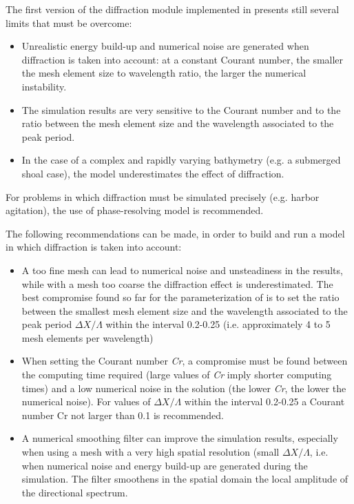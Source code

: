  The first version of the diffraction module implemented in \tomawac presents still several limits that must be overcome:

\begin{itemize}
\item  Unrealistic energy build-up and numerical noise are generated when diffraction is taken into account: at a constant Courant
  number, the smaller the mesh element size to wavelength ratio, the larger the numerical instability.

\item  The simulation results are very sensitive to the Courant number and to the ratio between the mesh element size and the
  wavelength associated to the peak period.

\item  In the case of a complex and rapidly varying bathymetry (e.g. a submerged shoal case), the model underestimates the effect of
  diffraction.
\end{itemize}

 For problems in which diffraction must be simulated precisely (e.g. harbor agitation), the use of phase-resolving model is recommended.

 The following recommendations can be made, in order to build and run a \tomawac model in which diffraction is taken into account:

\begin{itemize}
\item  A too fine mesh can lead to numerical noise and unsteadiness in the results, while with a mesh too coarse the diffraction
  effect is underestimated. The best compromise found so far for the parameterization of \tomawac is to set the ratio between the
  smallest mesh element size and the wavelength associated to the peak period $\Delta X/\Lambda$ within the interval 0.2-0.25 (i.e.
  approximately 4 to 5 mesh elements per wavelength)

\item  When setting the Courant number \textit{Cr}, a compromise must be found between the computing time required (large values of
  \textit{Cr} imply shorter computing times) and a low numerical noise in the solution (the lower \textit{Cr}, the lower the numerical
  noise). For values of  $\Delta X/\Lambda$ within the interval 0.2-0.25 a Courant number Cr not larger than 0.1 is recommended.

\item  A numerical smoothing filter can improve the simulation results, especially when using a mesh with a very high spatial resolution
  (small $\Delta X/\Lambda$, i.e. when numerical noise and energy build-up are generated during the simulation. The filter smoothens in
  the spatial domain the local amplitude of the directional spectrum.
\end{itemize}


